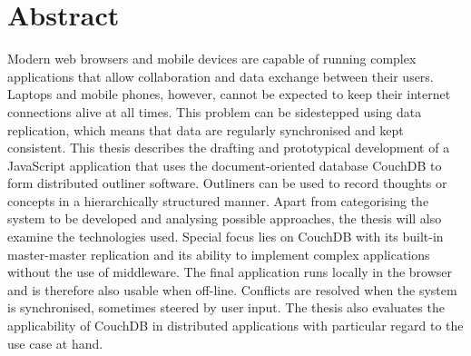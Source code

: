 \chapter*{Abstract}

Modern web browsers and mobile devices are capable of running complex applications that allow collaboration and data exchange between their users. Laptops and mobile phones, however, cannot be expected to keep their internet connections alive at all times. This problem can be sidestepped using data replication, which means that data are regularly synchronised and kept consistent. This thesis describes the drafting and prototypical development of a JavaScript application that uses the document-oriented database CouchDB to form distributed outliner software. Outliners can be used to record thoughts or concepts in a hierarchically structured manner. Apart from categorising the system to be developed and analysing possible approaches, the thesis will also examine the technologies used. Special focus lies on CouchDB with its built-in master-master replication and its ability to implement complex applications without the use of middleware. The final application runs locally in the browser and is therefore also usable when off-line. Conflicts are resolved when the system is synchronised, sometimes steered by user input. The thesis also evaluates the applicability of CouchDB in distributed applications with particular regard to the use case at hand.